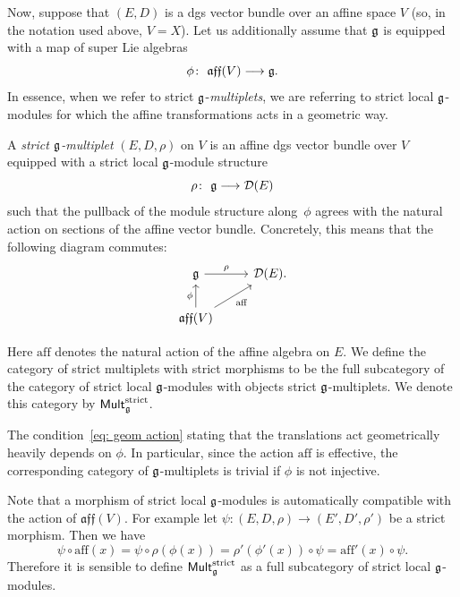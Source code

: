 \documentclass[pdftex]{sigma}
\numberwithin{equation}{section}
\def\cat#1{\ensuremath{\mathsf{#1}}}
\DeclareMathOperator{\Mult}{\cat{Mult}}
\def\lie#1{\ensuremath{\mathfrak{#1}}}
\def\aff{\ensuremath{\lie{aff}}}
\begin{document}
Now, suppose that $(E,D)$ is a dgs vector bundle over an affine space $V$ (so, in the notation used above, $V=X$). Let us additionally assume that $\mathfrak g$ is equipped with a map of super Lie algebras
\begin{equation*}
\phi \colon \ \aff(V) \longrightarrow \fg .
\end{equation*}
In essence, when we refer to strict $\mathfrak g$-\emph{multiplets}, we are referring to strict local $\mathfrak g$-modules for which the affine transformations acts in a geometric way.
\begin{dfn}
	A \emph{strict $\mathfrak g$-multiplet} $(E,D,\rho)$ on $V$ is an affine dgs vector bundle over $V$ equipped with a strict local $\mathfrak g$-module structure
	\begin{equation*}
	\rho \colon \ \mathfrak g \longrightarrow \mathcal D(E)
	\end{equation*}
	such that the pullback of the module structure along~$\phi$ agrees with the natural action on sections of the affine vector bundle. Concretely, this means that the following diagram commutes:
	\begin{equation} \label{eq: geom action}
	\begin{tikzcd}
	\fg \arrow[r, "\rho"] & \cD(E). \\
	\aff(V) \arrow[ru, "\mathrm{aff}" '] \arrow[u,"\phi"]
	\end{tikzcd}
	\end{equation}
\end{dfn}
Here $\mathrm{aff}$ denotes the natural action of the affine algebra on $E$.
We define the category of strict multiplets with strict morphisms to be the full subcategory of the category of strict local $\mathfrak g$-modules with objects strict $\mathfrak g$-multiplets. We denote this category by $\Mult_{\fg}^{\mathrm{strict}}$.
%
\begin{rmk}
	The condition~\eqref{eq: geom action} stating that the translations act geometrically heavily depends on $\phi$. In particular, since the action $\mathrm{aff}$ is effective, the corresponding category of $\mathfrak g$-multiplets is trivial if $\phi$ is not injective.
\end{rmk}
\begin{rmk}
	Note that a morphism of strict local $\mathfrak g$-modules is automatically compatible with the action of $\aff(V)$. For example let $\psi \colon (E,D,\rho) \longrightarrow (E',D',\rho')$ be a strict morphism. Then we have
	\begin{equation*}
	\psi \circ \mathrm{aff}(x) = \psi \circ \rho(\phi(x)) = \rho'(\phi'(x)) \circ \psi = \mathrm{aff}'(x) \circ \psi .
	\end{equation*}
	Therefore it is sensible to define $\Mult_\fg^{\text{strict}}$ as a full subcategory of strict local $\mathfrak g$-modules.
\end{rmk}
%
\end{document}
